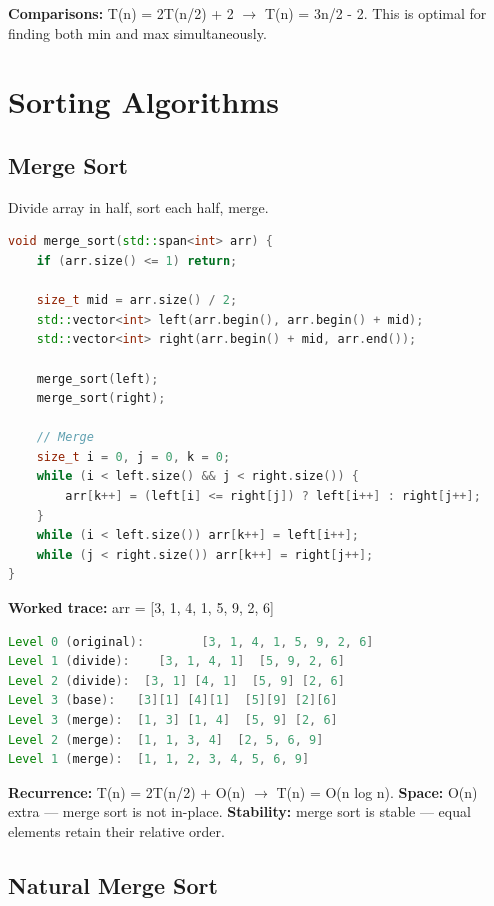 \textbf{Comparisons:} T(n) = 2T(n/2) + 2 $\to$ T(n) = 3n/2 - 2. This is optimal for finding both min and max simultaneously.

\section{Sorting Algorithms}

\subsection{Merge Sort}

Divide array in half, sort each half, merge.

\begin{lstlisting}[language=C++]
void merge_sort(std::span<int> arr) {
    if (arr.size() <= 1) return;

    size_t mid = arr.size() / 2;
    std::vector<int> left(arr.begin(), arr.begin() + mid);
    std::vector<int> right(arr.begin() + mid, arr.end());

    merge_sort(left);
    merge_sort(right);

    // Merge
    size_t i = 0, j = 0, k = 0;
    while (i < left.size() && j < right.size()) {
        arr[k++] = (left[i] <= right[j]) ? left[i++] : right[j++];
    }
    while (i < left.size()) arr[k++] = left[i++];
    while (j < right.size()) arr[k++] = right[j++];
}
\end{lstlisting}

\textbf{Worked trace:} arr = [3, 1, 4, 1, 5, 9, 2, 6]

\begin{lstlisting}[language=Java]
Level 0 (original):        [3, 1, 4, 1, 5, 9, 2, 6]
Level 1 (divide):    [3, 1, 4, 1]  [5, 9, 2, 6]
Level 2 (divide):  [3, 1] [4, 1]  [5, 9] [2, 6]
Level 3 (base):   [3][1] [4][1]  [5][9] [2][6]
Level 3 (merge):  [1, 3] [1, 4]  [5, 9] [2, 6]
Level 2 (merge):  [1, 1, 3, 4]  [2, 5, 6, 9]
Level 1 (merge):  [1, 1, 2, 3, 4, 5, 6, 9]
\end{lstlisting}

\textbf{Recurrence:} T(n) = 2T(n/2) + O(n) $\to$ T(n) = O(n log n).  
\textbf{Space:} O(n) extra — merge sort is not in-place.  
\textbf{Stability:} merge sort is stable — equal elements retain their relative order.

\subsection{Natural Merge Sort}

